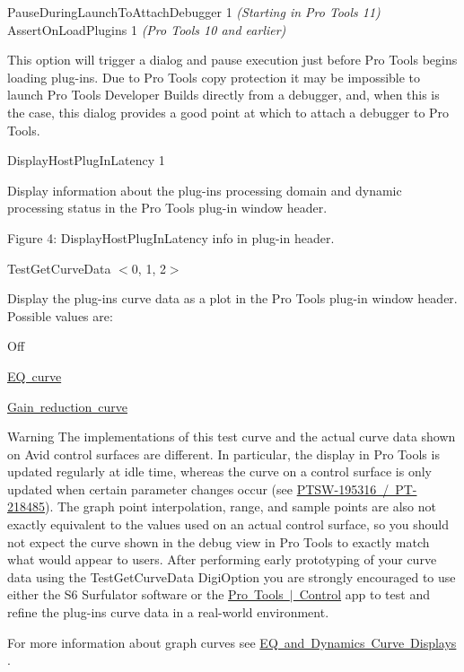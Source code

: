 \begin{DoxyItemize}
\item  {\ttfamily Pause\+During\+Launch\+To\+Attach\+Debugger 1} {\itshape (Starting in Pro Tools 11)}~\newline
 {\ttfamily Assert\+On\+Load\+Plugins 1} {\itshape (Pro Tools 10 and earlier)}

This option will trigger a dialog and pause execution just before Pro Tools begins loading plug-\/ins. Due to Pro Tools copy protection it may be impossible to launch Pro Tools Developer Builds directly from a debugger, and, when this is the case, this dialog provides a good point at which to attach a debugger to Pro Tools.


\item  {\ttfamily Display\+Host\+Plug\+In\+Latency 1}

Display information about the plug-\/in\textquotesingle{}s processing domain and dynamic processing status in the Pro Tools plug-\/in window header.

  Figure 4\+: Display\+Host\+Plug\+In\+Latency info in plug-\/in header.


\item  {\ttfamily Test\+Get\+Curve\+Data $<$0, 1, 2$>$}

Display the plug-\/in\textquotesingle{}s curve data as a plot in the Pro Tools plug-\/in window header. Possible values are\+: 
\begin{DoxyEnumerate}
\item Off 
\item \mbox{\hyperlink{a00812_gga59c73d8f51c5c55d54a728eff39da884a01b32d7031ceff45f7acad05dcddad19}{EQ curve}} 
\item \mbox{\hyperlink{a00812_gga59c73d8f51c5c55d54a728eff39da884a011b1b00d6189a8903735dcae2f8bc93}{Gain reduction curve}} 
\end{DoxyEnumerate}\begin{DoxyWarning}{Warning}
The implementations of this test curve and the actual curve data shown on Avid control surfaces are different. In particular, the display in Pro Tools is updated regularly at idle time, whereas the curve on a control surface is only updated when certain parameter changes occur (see \mbox{\hyperlink{a00846_PTSW-195316}{P\+T\+S\+W-\/195316 / P\+T-\/218485}}). The graph point interpolation, range, and sample points are also not exactly equivalent to the values used on an actual control surface, so you should not expect the curve shown in the debug view in Pro Tools to exactly match what would appear to users. After performing early prototyping of your curve data using the Test\+Get\+Curve\+Data Digi\+Option you are strongly encouraged to use either the S6 Surfulator software or the \mbox{\hyperlink{a00833_subsubsection__avid_ptcontrol}{Pro Tools $\vert$ Control}} app to test and refine the plug-\/in\textquotesingle{}s curve data in a real-\/world environment.
\end{DoxyWarning}
For more information about graph curves see \mbox{\hyperlink{a00812}{EQ and Dynamics Curve Displays}} .


\end{DoxyItemize}
